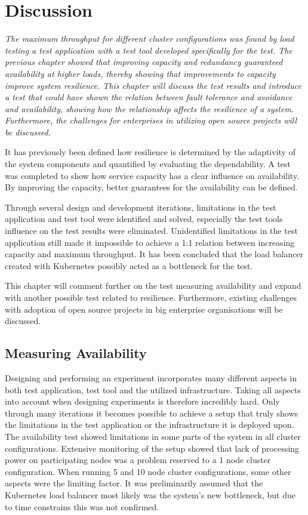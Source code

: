 \chapter{Discussion}
\label{ch:discussion}

\textit{The maximum throughput for different cluster configurations was found by load testing a test application with a test tool developed specifically for the test. The previous chapter showed that improving capacity and redundancy guaranteed availability at higher loads, thereby showing that improvements to capacity improve system resilience. This chapter will discuss the test results and introduce a test that could have shown the relation between fault tolerance and avoidance and availability, showing how the relationship affects the resilience of a system. Furthermore, the challenges for enterprises in utilizing open source projects will be discussed.}

It has previously been defined how resilience is determined by the adaptivity of the system components and quantified by evaluating the dependability. A test was completed to show how service capacity has a clear influence on availability. By improving the capacity, better guarantees for the availability can be defined.

Through several design and development iterations, limitations in the test application and test tool were identified and solved, especially the test tools influence on the test results were eliminated. Unidentified limitations in the test application still made it impossible to achieve a 1:1 relation between increasing capacity and maximum throughput. It has been concluded that the load balancer created with Kubernetes possibly acted as a bottleneck for the test. 

This chapter will comment further on the test measuring availability and expand with another possible test related to resilience. Furthermore, existing challenges with adoption of open source projects in big enterprise organisations will be discussed.

\section{Measuring Availability}
Designing and performing an experiment incorporates many different aspects in both test application, test tool and the utilized infrastructure. Taking all aspects into account when designing experiments is therefore incredibly hard. Only through many iterations it becomes possible to achieve a setup that truly shows the limitations in the test application or the infrastructure it is deployed upon. The availability test showed limitations in some parts of the system in all cluster configurations. Extensive monitoring of the setup showed that lack of processing power on participating nodes was a problem reserved to a 1 node cluster configuration. When running 5 and 10 node cluster configurations, some other aspects were the limiting factor. It was preliminarily assumed that the Kubernetes load balancer most likely was the system's new bottleneck, but due to time constrains this was not confirmed.

